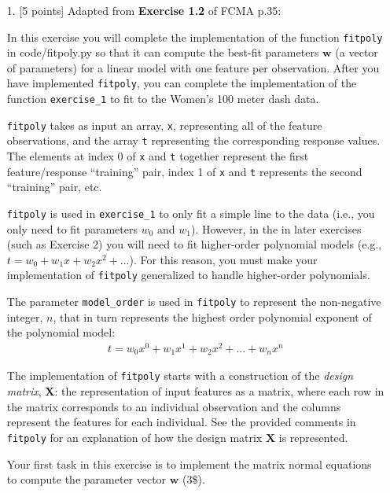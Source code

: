 \documentclass[10pt]{article}
\begin{document}
\newpage
\begin{itemize}



\item[1.] [5 points]
Adapted from {\bf Exercise 1.2} of FCMA p.35:

In this exercise you will complete the implementation of the function {\tt fitpoly} in {code/fitpoly.py} so that it can compute the best-fit parameters $\mathbf{w}$ (a vector of parameters) for a linear model with one feature per observation. After you have implemented {\tt fitpoly}, you can complete the implementation of the function {\tt exercise\_1} to fit to the Women's 100 meter dash data.

{\tt fitpoly} takes as input an array, {\tt x}, representing all of the feature observations, and the array {\tt t} representing the corresponding response values. The elements at index 0 of {\tt x} and {\tt t} together represent the first feature/response ``training'' pair, index 1 of {\tt x} and {\tt t} represents the second ``training'' pair, etc.

{\tt fitpoly} is used in {\tt exercise\_1} to only fit a simple line to the data (i.e., you only need to fit parameters $w_0$ and $w_1$). However, in the in later exercises (such as Exercise 2) you will need to fit higher-order polynomial models (e.g., $t = w_0 + w_1x + w_2x^2 + ...$). For this reason, you must make your implementation of {\tt fitpoly} generalized to handle higher-order polynomials. 

The parameter {\tt model\_order} is used in {\tt fitpoly} to represent the non-negative integer, $n$, that in turn represents the highest order polynomial exponent of the polynomial model:
\begin{eqnarray*}
t = w_0 x^0 + w_1 x^1 + w_2 x^2 + ... + w_n x^n
\end{eqnarray*}

The implementation of {\tt fitpoly} starts with a construction of the {\em design matrix}, $\mathbf{X}$: the representation of input features as a matrix, where each row in the matrix corresponds to an individual observation and the columns represent the features for each individual. See the provided comments in {\tt fitpoly} for an explanation of how the design matrix $\mathbf{X}$ is represented.

Your first task in this exercise is to implement the matrix normal equations to compute the parameter vector $\mathbf{w}$ (3\$).


\end{itemize}
\end{document}
